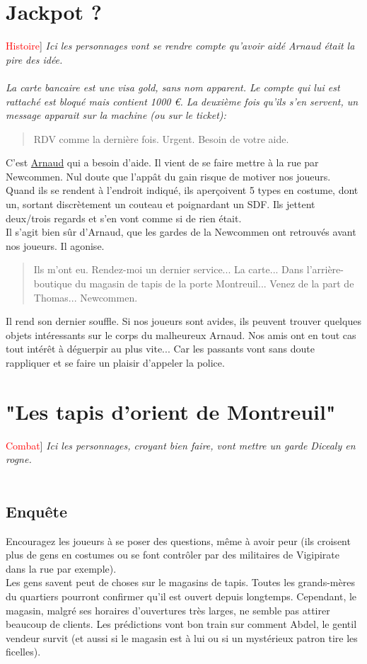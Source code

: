 \documentclass[10pt,a4paper,twocolumn]{article}
\newenvironment{lAbstract}[1]{{[}\textcolor{red}{#1}{]}\itshape}{\\ \\}
\begin{document}
\section{Jackpot ?}
\begin{lAbstract}{Histoire}
Ici les personnages vont se rendre compte qu'avoir aidé Arnaud était la pire des idée.
\end{lAbstract}
La carte bancaire est une visa gold, sans nom apparent. Le compte qui lui est rattaché est bloqué mais contient 1000 €. La deuxième fois qu'ils s'en servent, un message apparait sur la machine (ou sur le ticket): 
\begin{quote}
RDV comme la dernière fois. Urgent. Besoin de votre aide.
\end{quote}
C'est \hyperlink{arnaud}{Arnaud} qui a besoin d'aide. Il vient de se faire mettre à la rue par Newcommen. Nul doute que l'appât du gain risque de motiver nos joueurs. \\
Quand ils se rendent à l'endroit indiqué, ils aperçoivent 5 types en costume, dont un, sortant discrètement un couteau et poignardant un SDF. Ils jettent deux/trois regards et s'en vont comme si de rien était.
\\
Il s'agit bien sûr d'Arnaud, que les gardes de la Newcommen ont retrouvés avant nos joueurs. Il agonise.
\begin{quote}
Ils m'ont eu. Rendez-moi un dernier service... La carte... Dans l'arrière-boutique du magasin de tapis de la porte Montreuil... Venez de la part de Thomas... Newcommen.
\end{quote}
Il rend son dernier souffle.
Si nos joueurs sont avides, ils peuvent trouver quelques objets intéressants sur le corps du malheureux Arnaud.
Nos amis ont en tout cas tout intérêt à déguerpir au plus vite... Car les passants vont sans doute rappliquer et se faire un plaisir d'appeler la police.

\section{"Les tapis d'orient de Montreuil"}
\begin{lAbstract}{Combat}
Ici les personnages, croyant bien faire, vont mettre un garde Dicealy en rogne.
\end{lAbstract}
\subsection*{Enquête}
Encouragez les joueurs à se poser des questions, même à avoir peur (ils croisent plus de gens en costumes ou se font contrôler par des militaires de Vigipirate dans la rue par exemple). \\
Les gens savent peut de choses sur le magasins de tapis. Toutes les grands-mères du quartiers pourront confirmer qu'il est ouvert depuis longtemps. Cependant, le magasin, malgré ses horaires d'ouvertures très larges, ne semble pas attirer beaucoup de clients. Les prédictions vont bon train sur comment Abdel, le gentil vendeur survit (et aussi si le magasin est à lui ou si un mystérieux patron tire les ficelles).
\end{document}
